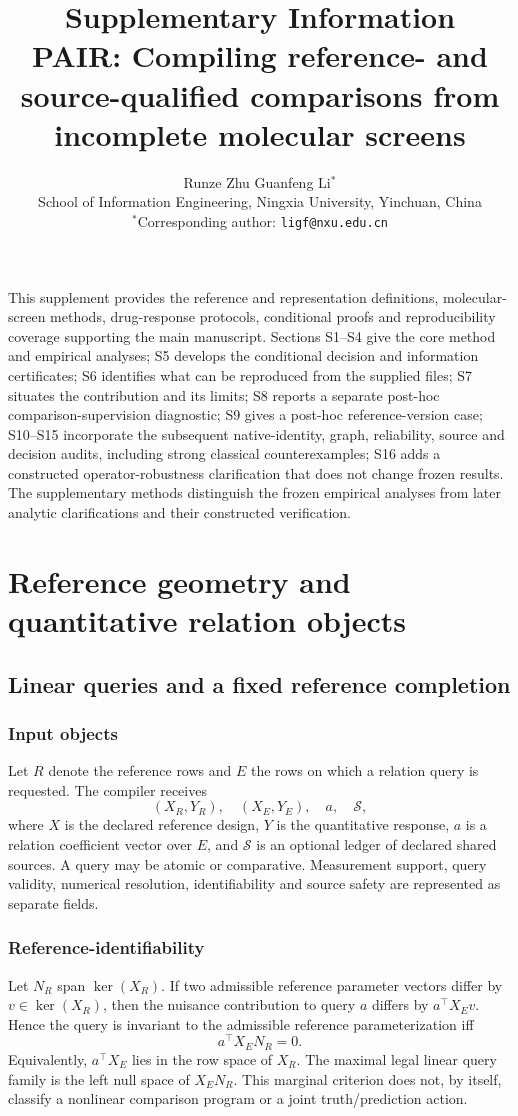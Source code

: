 \documentclass[11pt]{article}
\title{\textbf{Supplementary Information}\\[0.6em]\large PAIR: Compiling reference- and source-qualified comparisons from incomplete molecular screens}
\author{Runze Zhu \quad Guanfeng Li$^{*}$\\[0.4em]
\small School of Information Engineering, Ningxia University, Yinchuan, China\\[0.25em]
\small $^{*}$Corresponding author: \texttt{ligf@nxu.edu.cn}}
\date{}
\begin{document}
\maketitle
\noindent This supplement provides the reference and representation definitions, molecular-screen methods, drug-response protocols, conditional proofs and reproducibility coverage supporting the main manuscript. Sections S1--S4 give the core method and empirical analyses; S5 develops the conditional decision and information certificates; S6 identifies what can be reproduced from the supplied files; S7 situates the contribution and its limits; S8 reports a separate post-hoc comparison-supervision diagnostic; S9 gives a post-hoc reference-version case; S10--S15 incorporate the subsequent native-identity, graph, reliability, source and decision audits, including strong classical counterexamples; S16 adds a constructed operator-robustness clarification that does not change frozen results. The supplementary methods distinguish the frozen empirical analyses from later analytic clarifications and their constructed verification.

\setlength{\cftbeforesecskip}{2pt}
\tableofcontents
\clearpage

\section{Reference geometry and quantitative relation objects}


\subsection{Linear queries and a fixed reference completion}
\subsubsection{Input objects}
Let $R$ denote the reference rows and $E$ the rows on which a relation query is requested. The compiler receives
\[
(X_R,Y_R),\quad (X_E,Y_E),\quad a,\quad \mathcal S,
\]
where $X$ is the declared reference design, $Y$ is the quantitative response, $a$ is a relation coefficient vector over $E$, and $\mathcal S$ is an optional ledger of declared shared sources. A query may be atomic or comparative. Measurement support, query validity, numerical resolution, identifiability and source safety are represented as separate fields.

\subsubsection{Reference-identifiability}
Let $N_R$ span $\ker(X_R)$. If two admissible reference parameter vectors differ by $v\in\ker(X_R)$, then the nuisance contribution to query $a$ differs by $a^\top X_Ev$. Hence the query is invariant to the admissible reference parameterization iff
\[
a^\top X_EN_R=0.
\]
Equivalently, $a^\top X_E$ lies in the row space of $X_R$. The maximal legal linear query family is the left null space of $X_EN_R$. This marginal criterion does not, by itself, classify a nonlinear comparison program or a joint truth/prediction action.
\end{document}
